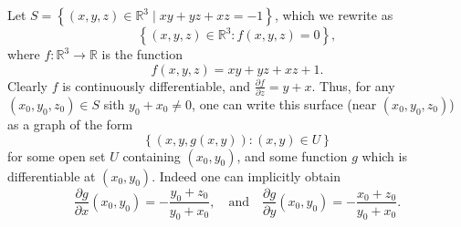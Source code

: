 \begin{eg}
    Let \(S = \left\{ (x, y, z) \in \mathbb{R} ^3 \mid xy + yz + xz = -1 \right\} \), which we rewrite as 
    \[
        \left\{ (x, y, z) \in \mathbb{R} ^3 : f(x, y, z) = 0 \right\} ,
    \]
     where \(f: \mathbb{R} ^3 \to \mathbb{R} \) is the function 
    \[
        f(x, y, z) = xy + yz + xz + 1.
    \]      
    Clearly \(f\) is continuously differentiable, and \(\frac{\partial f}{\partial z} = y + x \). Thus, for any \((x_0, y_0, z_0) \in S\) sith \(y_0 + x_0 \neq 0\), one can write this surface (near \((x_0, y_0, z_0)\)) as a graph of the form 
    \[
        \left\{ (x, y, g(x, y)) : (x, y) \in U \right\} 
    \]   
    for some open set \(U\) containing \((x_0, y_0)\), and some function \(g\) which is differentiable at \((x_0, y_0)\). Indeed one can implicitly obtain
    \[
        \frac{\partial g}{\partial x} (x_0, y_0) = - \frac{y_0 + z_0}{y_0 + x_0}, \quad \text{and} \quad \frac{\partial g}{\partial y}(x_0, y_0) = -\frac{x_0 + z_0}{y_0 + x_0}.    
    \]    
\end{eg}